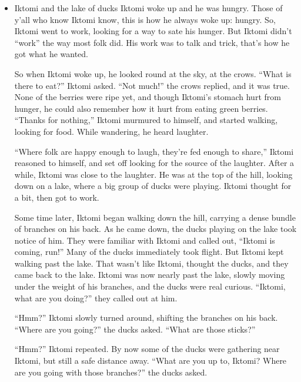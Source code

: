 \documentclass[11pt]{article}
\begin{document}
\begin{itemize}
\begin{itemize}
\begin{itemize}
What is kyriarchal practice? Answering questions with kyriarchal complicity.

What is anti-kyriarchal practice? Looking for different answers.

What is Indigenous praxis? Using answers based in truth.

So what’s truth? Taking a break now, but when I return I’ve got a story about ducks.
\end{itemize}
\item Iktomi and the lake of ducks
\label{sec:orgb32cfa2}
Iktomi woke up and he was hungry. Those of y’all who know Iktomi know, this is how he always woke up: hungry. So, Iktomi went to work, looking for a way to sate his hunger. But Iktomi didn’t “work” the way most folk did. His work was to talk and trick, that’s how he got what he wanted.

So when Iktomi woke up, he looked round at the sky, at the crows. “What is there to eat?” Iktomi asked. “Not much!” the crows replied, and it was true. None of the berries were ripe yet, and though Iktomi’s stomach hurt from hunger, he could also remember how it hurt from eating green berries. “Thanks for nothing,” Iktomi murmured to himself, and started walking, looking for food. While wandering, he heard laughter.

“Where folk are happy enough to laugh, they’re fed enough to share,” Iktomi reasoned to himself, and set off looking for the source of the laughter. After a while, Iktomi was close to the laughter. He was at the top of the hill, looking down on a lake, where a big group of ducks were playing. Iktomi thought for a bit, then got to work.

Some time later, Iktomi began walking down the hill, carrying a dense bundle of branches on his back. As he came down, the ducks playing on the lake took notice of him. They were familiar with Iktomi and called out, “Iktomi is coming, run!” Many of the ducks immediately took flight. But Iktomi kept walking past the lake. That wasn’t like Iktomi, thought the ducks, and they came back to the lake. Iktomi was now nearly past the lake, slowly moving under the weight of his branches, and the ducks were real curious. “Iktomi, what are you doing?” they called out at him.

“Hmm?” Iktomi slowly turned around, shifting the branches on his back. “Where are you going?” the ducks asked. “What are those sticks?”

“Hmm?” Iktomi repeated. By now some of the ducks were gathering near Iktomi, but still a safe distance away. “What are you up to, Iktomi? Where are you going with those branches?” the ducks asked.


\end{itemize}
\end{itemize}
\end{document}
